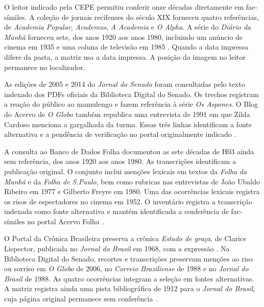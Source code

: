 O leitor indicado pela CEPE permitiu conferir onze décadas diretamente em fac-símiles. A coleção de jornais recifenses do século XIX forneceu quatro referências, de \textit{Academia Popular}, \textit{Academus}, \textit{A Academia} e \textit{O Alpha}. A série do \textit{Diário da Manhã} forneceu sete, dos anos 1920 aos anos 1980, incluindo um anúncio de cinema em 1935 e uma coluna de televisão em 1985 \cite{acervoD068,acervoD069,acervoD070,acervoD071,acervoD062,acervoD067}. Quando a data impressa difere da pasta, a matriz usa a data impressa. A posição da imagem no leitor permanece no localizador.

As edições de 2005 e 2014 do \textit{Jornal do Senado} foram consultadas pelo texto indexado dos PDFs oficiais da Biblioteca Digital do Senado. Os trechos registram a reação do público ao mamulengo e fazem referência à série \textit{Os Aspones}. O Blog do Acervo de \textit{O Globo} também republica uma entrevista de 1991 em que Zilda Cardoso menciona a gargalhada da turma. Essas três linhas identificam a fonte alternativa e a pendência de verificação no portal originalmente indicado \cite{acervoD072,acervoD073,acervoD074}.

A consulta ao Banco de Dados Folha documentou as sete décadas de H03 ainda sem referência, dos anos 1920 aos anos 1980. As transcrições identificam a publicação original. O conjunto inclui menções lexicais em textos da \textit{Folha da Manhã} e da \textit{Folha de S.Paulo}, bem como rubricas nas entrevistas de João Ubaldo Ribeiro em 1977 e Gilberto Freyre em 1980. Uma das ocorrências lexicais registra os risos de espectadores no cinema em 1952. O inventário registra a transcrição indexada como fonte alternativa e mantém identificada a conferência de fac-símiles no portal Acervo Folha \cite{acervoD075,acervoD076,acervoD077,acervoD078,acervoD079,acervoD080,acervoD081}.

O Portal da Crônica Brasileira preserva a crônica \textit{Estado de graça}, de Clarice Lispector, publicada no \textit{Jornal do Brasil} em 1968, com a expressão . Na Biblioteca Digital do Senado, recortes e transcrições preservam menções ao riso ou sorriso em \textit{O Globo} de 2006, no \textit{Correio Braziliense} de 1988 e no \textit{Jornal do Brasil} de 1988. As quatro ocorrências integram a seleção em fontes alternativas. A matriz registra ainda uma pista bibliográfica de 1912 para o \textit{Jornal do Brasil}, cuja página original permanece sem conferência \cite{acervoD082,acervoD083,acervoD084,acervoD085}.

